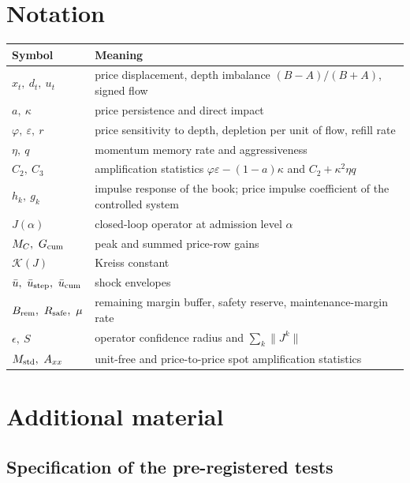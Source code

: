 \documentclass[12pt]{article}
\theoremstyle{definition}
\theoremstyle{remark}
\begin{document}
\section{Notation}\label{app:notation}
\begin{longtable}{p{}p{}}
\toprule
Symbol & Meaning\\
\midrule
\endhead
$x_t,\ d_t,\ u_t$ & price displacement, depth imbalance $(B-A)/(B+A)$, signed flow\\
$a,\ \kappa$ & price persistence and direct impact\\
$\varphi,\ \varepsilon,\ r$ & price sensitivity to depth, depletion per unit of flow, refill rate\\
$\eta,\ q$ & momentum memory rate and aggressiveness\\
$C_2,\ C_3$ & amplification statistics $\varphi\varepsilon-(1-a)\kappa$ and $C_2+\kappa^2\eta q$\\
$h_k,\ g_k$ & impulse response of the book; price impulse coefficient of the controlled system\\
$J(\alpha)$ & closed-loop operator at admission level $\alpha$\\
$M_C,\ G_{\rm cum}$ & peak and summed price-row gains\\
$\mathcal K(J)$ & Kreiss constant\\
$\bar u,\ \bar u_{\rm step},\ \bar u_{\rm cum}$ & shock envelopes\\
$B_{\rm rem},\ R_{\rm safe},\ \mu$ & remaining margin buffer, safety reserve, maintenance-margin rate\\
$\epsilon,\ S$ & operator confidence radius and $\sum_k\|J^k\|$\\
$M_{\rm std},\ A_{xx}$ & unit-free and price-to-price spot amplification statistics\\
\bottomrule
\end{longtable}

\section{Additional material}\label{app:ia}

\subsection{Specification of the pre-registered tests}
\end{document}
